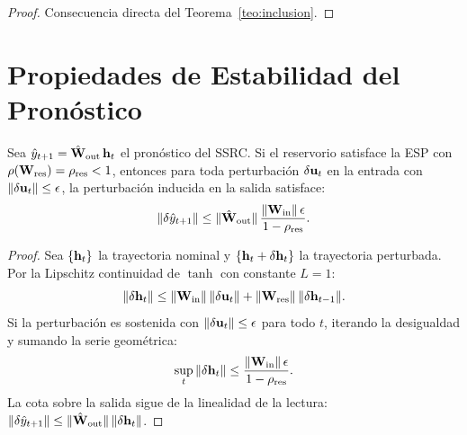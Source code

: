 \begin{proof}
Consecuencia directa del Teorema~\ref{teo:inclusion}.
\end{proof}

\section{Propiedades de Estabilidad del Pronóstico}
\label{sec:ssrc_estabilidad}

\begin{proposition}
\label{prop:acotacion_error}
Sea $\hat{y}_{t+1} = \hat{\mathbf{W}}_{\text{out}}\,\mathbf{h}_t$ el
pronóstico del SSRC.  Si el reservorio satisface la ESP con
$\rho(\mathbf{W}_{\text{res}}) = \rho_{\text{res}} < 1$, entonces
para toda perturbación $\delta\mathbf{u}_t$ en la entrada con
$\|\delta\mathbf{u}_t\| \le \epsilon$, la perturbación inducida en
la salida satisface:
\begin{equation}
    \|\delta \hat{y}_{t+1}\| \le
    \|\hat{\mathbf{W}}_{\text{out}}\|\,
    \frac{\|\mathbf{W}_{\text{in}}\|\,\epsilon}
    {1 - \rho_{\text{res}}}.
    \label{eq:acotacion_perturbacion}
\end{equation}
\end{proposition}

\begin{proof}
Sea $\{\mathbf{h}_t\}$ la trayectoria nominal y
$\{\mathbf{h}_t + \delta\mathbf{h}_t\}$ la trayectoria perturbada.
Por la Lipschitz continuidad de $\tanh$ con constante $L = 1$:
\begin{equation}
    \|\delta\mathbf{h}_t\| \le
    \|\mathbf{W}_{\text{in}}\|\,\|\delta\mathbf{u}_t\| +
    \|\mathbf{W}_{\text{res}}\|\,\|\delta\mathbf{h}_{t-1}\|.
\end{equation}
Si la perturbación es sostenida con
$\|\delta\mathbf{u}_t\| \le \epsilon$ para todo $t$, iterando
la desigualdad y sumando la serie geométrica:
\begin{equation}
    \sup_t \|\delta\mathbf{h}_t\| \le
    \frac{\|\mathbf{W}_{\text{in}}\|\,\epsilon}
    {1 - \rho_{\text{res}}}.
\end{equation}
La cota sobre la salida sigue de la linealidad de la lectura:
$\|\delta\hat{y}_{t+1}\| \le \|\hat{\mathbf{W}}_{\text{out}}\|\,
\|\delta\mathbf{h}_t\|$.
\end{proof}

